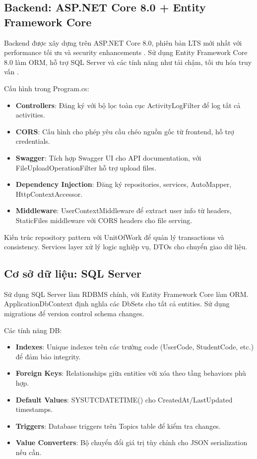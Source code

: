 \documentclass[conference,a4paper]{IEEEtran}
\begin{document}
\subsection{Backend: ASP.NET Core 8.0 + Entity Framework Core}
Backend được xây dựng trên ASP.NET Core 8.0, phiên bản LTS mới nhất với performance tối ưu và security enhancements \cite{lee2022asp}. Sử dụng Entity Framework Core 8.0 làm ORM, hỗ trợ SQL Server và các tính năng như tải chậm, tối ưu hóa truy vấn \cite{chen2021sql}.

Cấu hình trong Program.cs:
\begin{itemize}
  \item \textbf{Controllers}: Đăng ký với bộ lọc toàn cục ActivityLogFilter để log tất cả activities.
  \item \textbf{CORS}: Cấu hình cho phép yêu cầu chéo nguồn gốc từ frontend, hỗ trợ credentials.
  \item \textbf{Swagger}: Tích hợp Swagger UI cho API documentation, với FileUploadOperationFilter hỗ trợ upload files.
  \item \textbf{Dependency Injection}: Đăng ký repositories, services, AutoMapper, HttpContextAccessor.
  \item \textbf{Middleware}: UserContextMiddleware để extract user info từ headers, StaticFiles middleware với CORS headers cho file serving.
\end{itemize}

Kiến trúc repository pattern với UnitOfWork để quản lý transactions và consistency. Services layer xử lý logic nghiệp vụ, DTOs cho chuyển giao dữ liệu.

\subsection{Cơ sở dữ liệu: SQL Server}
Sử dụng SQL Server làm RDBMS chính, với Entity Framework Core làm ORM. ApplicationDbContext định nghĩa các DbSets cho tất cả entities. Sử dụng migrations để version control schema changes.

Các tính năng DB:
\begin{itemize}
  \item \textbf{Indexes}: Unique indexes trên các trường code (UserCode, StudentCode, etc.) để đảm bảo integrity.
  \item \textbf{Foreign Keys}: Relationships giữa entities với xóa theo tầng behaviors phù hợp.
  \item \textbf{Default Values}: SYSUTCDATETIME() cho CreatedAt/LastUpdated timestamps.
  \item \textbf{Triggers}: Database triggers trên Topics table để kiểm tra changes.
  \item \textbf{Value Converters}: Bộ chuyển đổi giá trị tùy chỉnh cho JSON serialization nếu cần.
\end{itemize}
\end{document}
